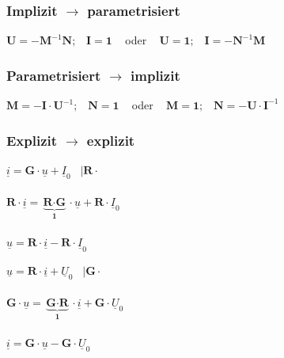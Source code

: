 \documentclass[a4paper,twocolumn,10pt]{article}
\begin{document}
\subsubsection*{Implizit $\rightarrow$ parametrisiert}
$\textbf{U}=-\textbf{M}^{-1}\textbf{N};\;\;\; \textbf{I}=\textbf{1}\;\;\;$ oder $\;\;\;\textbf{U}=\textbf{1};\;\;\; \textbf{I}=-\textbf{N}^{-1}\textbf{M}$

\subsubsection*{Parametrisiert $\rightarrow$ implizit}
$\textbf{M}=-\textbf{I}\cdot\textbf{U}^{-1};\;\;\; \textbf{N}=\textbf{1}\;\;\;$ oder $\;\;\;\textbf{M}=\textbf{1};\;\;\; \textbf{N}=-\textbf{U}\cdot\textbf{I}^{-1}$

\subsubsection*{Explizit $\rightarrow$ explizit}
\begin{minipage}[b]{0.23\textwidth}
$\underline{i}=\textbf{G}\cdot \underline{u}+\underline{I}_0\;\;\;|\textbf{R}\cdot$\\\\
$\textbf{R}\cdot \underline{i}=\underbrace{\textbf{R}\cdot\textbf{G}}_{\textbf{1}}\cdot \underline{u}+\textbf{R}\cdot\underline{I}_0$\\\\
$\underline{u}=\textbf{R}\cdot\underline{i}-\textbf{R}\cdot\underline{I}_0$
\end{minipage}
\hfill
\begin{minipage}[b]{0.23\textwidth}
$\underline{u}=\textbf{R}\cdot \underline{i}+\underline{U}_0\;\;\;|\textbf{G}\cdot$\\\\
$\textbf{G}\cdot \underline{u}=\underbrace{\textbf{G}\cdot\textbf{R}}_{\textbf{1}}\cdot \underline{i}+\textbf{G}\cdot\underline{U}_0$\\\\
$\underline{i}=\textbf{G}\cdot\underline{u}-\textbf{G}\cdot\underline{U}_0$
\end{minipage}\\\\
\end{document}
